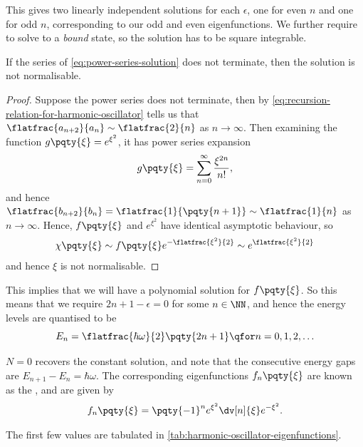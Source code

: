 This gives two linearly independent solutions for each \(\epsilon\), one for even \(n\) and one for odd \(n\), corresponding to our odd and even eigenfunctions. We further require to solve to a \emph{bound} state, so the solution has to be square integrable.

\begin{proposition}
    If the series of \eqref{eq:power-series-solution} does not terminate, then the solution is not normalisable.
\end{proposition}

\begin{proof}
    Suppose the power series does not terminate, then by \eqref{eq:recursion-relation-for-harmonic-oscillator} tells us that \(\flatfrac{a_{n + 2}}{a_n} \sim \flatfrac{2}{n}\) as \(n \to \infty\). Then examining the function \(g\pqty{\xi} = e^{\xi^2}\), it has power series expansion
    \begin{equation}
        g\pqty{\xi} = \sum_{n = 0}^{\infty} \frac{\xi^{2 n}}{n!},
    \end{equation}
    and hence \(\flatfrac{b_{n + 2}}{b_n} = \flatfrac{1}{\pqty{n + 1}} \sim \flatfrac{1}{n}\) as \(n \to \infty\). Hence, \(f\pqty{\xi}\) and \(e^{\xi^2}\) have identical asymptotic behaviour, so
    \begin{equation}
        \chi\pqty{\xi} \sim f\pqty{\xi} e^{-\flatfrac{\xi^2}{2}} \sim e^{\flatfrac{\xi^2}{2}} 
    \end{equation}
    and hence \(\xi\) is not normalisable.
\end{proof}

This implies that we will have a polynomial solution for \(f\pqty{\xi}\). So this means that we require \(2 n + 1 - \epsilon = 0\) for some \(n \in \NN\), and hence the energy levels are quantised to be
\begin{equation}
    E_n = \flatfrac{\hbar \omega}{2} \pqty{2 n + 1} \qfor n = 0, 1, 2, \ldots
\end{equation}

\(N = 0\) recovers the constant solution, and note that the consecutive energy gaps are \(E_{n + 1} - E_n = \hbar \omega\). The corresponding eigenfunctions \(f_n\pqty{\xi}\) are known as the , and are given by
\begin{equation}
    f_n\pqty{\xi} = \pqty{-1}^{n} e^{\xi^2} \dv[n]{\xi} e^{-\xi^2}.
\end{equation}

The first few values are tabulated in \autoref{tab:harmonic-oscillator-eigenfunctions}.

